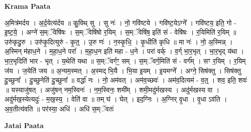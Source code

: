 \documentclass[17pt]{extarticle}
\begin{document}
\textbf{Krama Paata} \newline

अ॒मित्र॑मर्दय । अ॒र्द॒येत्य॑र्दय ॥ कु॒विथ् सु । सु नः॑ । नो॒ गवि॑ष्टये । गवि॑ष्ट॒येऽग्ने᳚ । गवि॑ष्टय॒ इति॒ गो - इ॒ष्ट॒ये॒ । अग्ने॑ स॒म्ॅवेषि॑षः । स॒म्ॅवेषि॑षो र॒यिम् । स॒म्ॅवेषि॑ष॒ इति॑ सं - वेषि॑षः । र॒यिमिति॑ र॒यिम् ॥ उरु॑कृदु॒रु । उरु॑कृ॒दित्युरु॑ - कृ॒त्॒ । उ॒रु णः॑ । न॒स्कृ॒धि॒ । कृ॒धीति॑ कृधि ॥ मा नः॑ । नो॒ अ॒स्मिन्न् । अ॒स्मिन् म॑हाध॒ने । म॒हा॒ध॒ने परा᳚ । म॒हा॒ध॒न इति॑ महा - ध॒ने । परा॑ वर्क् । व॒र्ग् भा॒र॒भृत् । भा॒र॒भृद् य॑था । भा॒र॒भृदिति॑ भार - भृत् । य॒थेति॑ यथा ॥ स॒म्ॅवर्गꣳ॒॒ सम् । स॒म्ॅवर्ग॒मिति॑ सं - वर्ग᳚म् । सꣳ र॒यिम् । र॒यिम् ज॑य । ज॒येति॑ जय ॥ अ॒न्यम॒स्मत् । अ॒स्मद् भि॒यै । भि॒या इ॒यम् । इ॒यमग्ने᳚ । अग्ने॒ सिष॑क्तु । सिष॑क्तु दु॒च्छुना᳚ । दु॒च्छुनेति॑ दु॒च्छुना᳚ ॥ वर्द्धा॑ नः । नो॒ अम॑वत् । अम॑व॒च्छवः॑ । अम॑व॒दित्यम॑ - व॒त्॒ । शव॒ इति॒ शवः॑ ॥ यस्याजु॑षत् । अजु॑षन् नम॒स्विनः॑ । न॒म॒स्विनः॒ शमी᳚म् । शमी॒मदु॑र्मखस्य । अदु॑र्मखस्य वा । अदु॑र्मख॒स्येत्यदुः॑ - म॒ख॒स्य॒ । वेति॑ वा ॥ तम् घ॑ । घेत् । इद॒ग्निः । अ॒ग्निर् वृ॒धा । वृ॒धा ऽव॑ति । अ॒व॒तीत्य॑वति ॥ पर॑स्या॒ अधि॑ । अधि॑ स॒म्ॅवतः॑ \newline

\textbf{Jatai Paata} \newline
\end{document}
